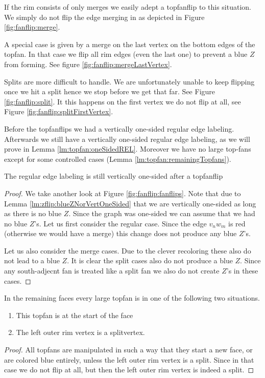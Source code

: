 If the rim consists of only merges we easily adept a topfanflip to this situation. We simply do not flip the edge merging in as depicted in Figure \ref{fig:fanflip:merge}.

A special case is given by a merge on the last vertex on the bottom edges of the topfan. In that case we flip all rim edges (even the last one) to prevent a blue $Z$ from forming. See figure \ref{fig:fanflip:mergeLastVertex}.

Splits are more difficult to handle. We are unfortunately unable to keep flipping once we hit a split hence we stop before we get that far. See Figure \ref{fig:fanflip:split}. It this happens on the first vertex we do not flip at all, see Figure \ref{fig:fanflip:splitFirstVertex}.

Before the topfanflips we had a vertically one-sided regular edge labeling. Afterwards we still have a vertically one-sided regular edge labeling, as we will prove in Lemma \ref{lm:topfan:oneSidedREL}. Moreover we have no large top-fans except for some controlled cases (Lemma \ref{lm:topfan:remainingTopfans}).

\begin{lemma}
  \label{lm:topfan:oneSidedREL}
  The regular edge labeling is still vertically one-sided after a topfanflip
\end{lemma}
\begin{proof}
  We take another look at Figure \ref{fig:fanflip:fanflips}. Note that due to Lemma \ref{lm:zflip:blueZNorVertOneSided} that we are vertically one-sided as long as there is no blue $Z$.  Since the graph was one-sided we can assume that we had no blue $Z$'s.
  Let us first consider the regular case. Since the edge  $v_n w_m$ is red (otherwise we would have a merge) this change does not produce any blue $Z$'s.

  Let us also consider the merge cases. Due to the clever recoloring these also do not lead to a blue $Z$.
  It is clear the split cases also do not produce a blue $Z$.
  Since any south-adjecnt fan is treated like a split fan we also do not create $Z$'s in these cases.
\end{proof}


\begin{lemma}
  \label{lm:topfan:remainingTopfans}
  In the remaining faces every large topfan is in one of the following two situations.
  \begin{enumerate}
    \item  This topfan is at the start of the face
    \item  The left outer rim vertex is a splitvertex.
  \end{enumerate}
\end{lemma}
\begin{proof}
  All topfans are manipulated in such a way that they start a new face, or are colored blue entirely, unless the left outer rim vertex is a split. Since in that case we do not flip at all, but then the left outer rim vertex is indeed a split.
\end{proof}
